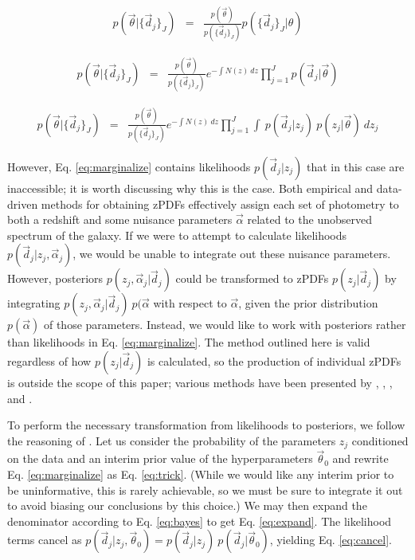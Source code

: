 \documentclass[12pt, onecolumn]{emulateapj}
\begin{document}
\begin{eqnarray}
\label{eq:bayes}
p(\vec{\theta}|\{\vec{d}_{j}\}_{J}) &=& \frac{p(\vec{\theta})}{p(\{\vec{d}_{j}\}_{J})}p(\{\vec{d}_{j}\}_{J}|\theta)
\end{eqnarray}

\begin{eqnarray}
\label{eq:posterior}
p(\vec{\theta}|\{\vec{d}_{j}\}_{J}) &=& \frac{p(\vec{\theta})}{p(\{\vec{d}_{j}\}_{J})}e^{-\int N(z)\ dz}\prod_{j=1}^{J}p(\vec{d}_{j}|\vec{\theta})
\end{eqnarray}

\begin{eqnarray}
\label{eq:marginalize}
p(\vec{\theta}|\{\vec{d}_{j}\}_{J}) &=& \frac{p(\vec{\theta})}{p(\{\vec{d}_{j}\}_{J})}e^{-\int N(z)\ dz}\prod_{j=1}^{J}\int\ p(\vec{d}_{j}|z_{j})\ p(z_{j}|\vec{\theta})\ dz_{j}
\end{eqnarray}

However, Eq. \ref{eq:marginalize} contains likelihoods $p(\vec{d}_{j}|z_{j})$ that in this case are inaccessible; it is worth discussing why this is the case.  Both empirical and data-driven methods for obtaining zPDFs effectively assign each set of photometry to both a redshift and some nuisance parameters $\vec{\alpha}$ related to the unobserved spectrum of the galaxy.  If we were to attempt to calculate likelihoods $p(\vec{d}_{j}|z_{j},\vec{\alpha}_{j})$, we would be unable to integrate out these nuisance parameters.  However, posteriors $p(z_{j},\vec{\alpha}_{j}|\vec{d}_{j})$ could be transformed to zPDFs $p(z_{j}|\vec{d}_{j})$ by integrating $p(z_{j},\vec{\alpha}_{j}|\vec{d}_{j})\ p(\vec{\alpha}$ with respect to $\vec{\alpha}$, given the prior distribution $p(\vec{\alpha})$ of those parameters.  Instead, we would like to work with posteriors rather than likelihoods in Eq. \ref{eq:marginalize}.  The method outlined here is valid regardless of how $p(z_{j}|\vec{d}_{j})$ is calculated, so the production of individual zPDFs is outside the scope of this paper; various methods have been presented by \citet{she11}, \citet{bal08}, \citet{car13}, and \citet{car14}.

To perform the necessary transformation from likelihoods to posteriors, we follow the reasoning of \citet{mar15}.  Let us consider the probability of the parameters $z_{j}$ conditioned on the data and an interim prior value of the hyperparameters $\vec{\theta}_{0}$ and rewrite Eq. \ref{eq:marginalize} as Eq. \ref{eq:trick}.  (While we would like any interim prior to be uninformative, this is rarely achievable, so we must be sure to integrate it out to avoid biasing our conclusions by this choice.)  We may then expand the denominator according to Eq. \ref{eq:bayes} to get Eq. \ref{eq:expand}.  The likelihood terms cancel as $p(\vec{d}_{j}|z_{j},\vec{\theta}_{0})=p(\vec{d}_{j}|z_{j})\ p(\vec{d}_{j}|\vec{\theta}_{0})$, yielding Eq. \ref{eq:cancel}.
\end{document}

